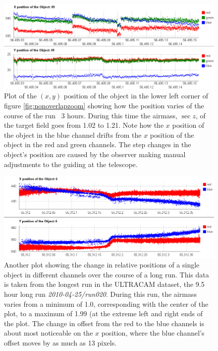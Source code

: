 \begin{figure}
  \centering
  \includegraphics[width=140mm]{images/position_drift.png}
  \caption{Plot of the $(x, y)$ position of the object in the lower left corner of figure \ref{fig:nonoverlapzoom} showing how the position varies of the course of the run ~3 hours. During this time the airmass, $\sec z$, of the target field goes from 1.02 to 1.21. Note how the $x$ position of the object in the blue channel drifts from the $x$ position of the object in the red and green channels. The step changes in the object's position are caused by the observer making manual adjustments to the guiding at the telescope. }
\label{fig:positiondrift}
\end{figure}

\begin{figure}
  \centering
  \includegraphics[width=140mm]{images/position_drift_longrun.png}
  \caption{Another plot showing the change in relative positions of a single object in different channels over the course of a long run. This data is taken from the longest run in the ULTRACAM dataset, the 9.5 hour long run \emph{2010-04-25/run020}. During this run, the airmass varies from a minimum of 1.0, corresponding with the center of the plot, to a maximum of 1.99 (at the extreme left and right ends of the plot. The change in offset from the red to the blue channels is about most noticeable on the $x$ position, where the blue channel's offset moves by as much as 13 pixels. }
\label{fig:positiondriftlongrun}
\end{figure}

